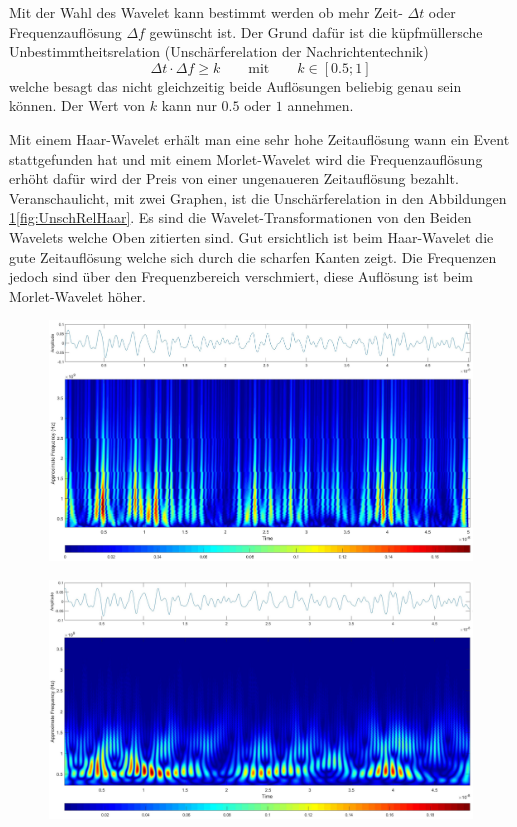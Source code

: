 \begin{refsection}
Mit der Wahl des Wavelet kann bestimmt werden ob mehr Zeit- $\Delta t$ oder Frequenzauflösung $\Delta f$ gewünscht ist. 
Der Grund dafür ist die küpfmüllersche Unbestimmtheitsrelation (Unschärferelation der Nachrichtentechnik)
\begin{equation}
\Delta t \cdot \Delta f \geq k 
\qquad\text{mit}\qquad
k \in [0.5 ; 1]
\end{equation}
welche besagt das nicht gleichzeitig beide Auflösungen beliebig genau sein können.
Der Wert von $k$ kann nur $0.5$ oder $1$ annehmen.

Mit einem Haar-Wavelet erhält man eine sehr hohe Zeitauflösung wann ein Event stattgefunden hat und mit einem Morlet-Wavelet wird die Frequenzauflösung erhöht dafür wird der Preis von einer ungenaueren Zeitauflösung bezahlt.
Veranschaulicht, mit zwei Graphen, ist die Unschärferelation in den Abbildungen \ref{fig:UnschRelMorl}\ref{fig:UnschRelHaar}. 
Es sind die Wavelet-Transformationen von den Beiden Wavelets welche Oben zitierten sind.
Gut ersichtlich ist beim Haar-Wavelet die gute Zeitauflösung welche sich durch die scharfen Kanten zeigt.
Die Frequenzen jedoch sind über den Frequenzbereich verschmiert, diese Auflösung ist beim Morlet-Wavelet höher.
\begin{figure}
	\centering
	\begin{minipage}{.5\textwidth}
		\centering
		\includegraphics[width=.9\linewidth]{papers/gis/Bilder/UnschRelHaar}
		\label{fig:UnschRelHaar}
	\end{minipage}%
	\begin{minipage}{.5\textwidth}
	\centering
	\includegraphics[width=.9\linewidth]{papers/gis/Bilder/UnschRelMorl}
	\label{fig:UnschRelMorl}
\end{minipage}
\end{figure}



\end{refsection}
